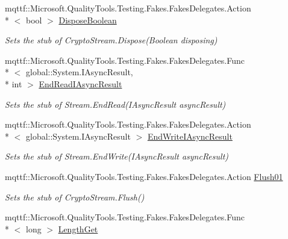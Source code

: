 \begin{DoxyCompactItemize}
mqttf\-::\-Microsoft.\-Quality\-Tools.\-Testing.\-Fakes.\-Fakes\-Delegates.\-Action\\*
$<$ bool $>$ \hyperlink{class_system_1_1_security_1_1_cryptography_1_1_fakes_1_1_stub_crypto_stream_afb4b1ab39426c48316f53e74feee9508}{Dispose\-Boolean}
\begin{DoxyCompactList}\small\item\em Sets the stub of Crypto\-Stream.\-Dispose(\-Boolean disposing)\end{DoxyCompactList}\item 
mqttf\-::\-Microsoft.\-Quality\-Tools.\-Testing.\-Fakes.\-Fakes\-Delegates.\-Func\\*
$<$ global\-::\-System.\-I\-Async\-Result, \\*
int $>$ \hyperlink{class_system_1_1_security_1_1_cryptography_1_1_fakes_1_1_stub_crypto_stream_aafd0c5a5584772dbd72efe3b71d7d7ee}{End\-Read\-I\-Async\-Result}
\begin{DoxyCompactList}\small\item\em Sets the stub of Stream.\-End\-Read(\-I\-Async\-Result async\-Result)\end{DoxyCompactList}\item 
mqttf\-::\-Microsoft.\-Quality\-Tools.\-Testing.\-Fakes.\-Fakes\-Delegates.\-Action\\*
$<$ global\-::\-System.\-I\-Async\-Result $>$ \hyperlink{class_system_1_1_security_1_1_cryptography_1_1_fakes_1_1_stub_crypto_stream_a9585b3a7159cc2dfd9fc541719978603}{End\-Write\-I\-Async\-Result}
\begin{DoxyCompactList}\small\item\em Sets the stub of Stream.\-End\-Write(\-I\-Async\-Result async\-Result)\end{DoxyCompactList}\item 
mqttf\-::\-Microsoft.\-Quality\-Tools.\-Testing.\-Fakes.\-Fakes\-Delegates.\-Action \hyperlink{class_system_1_1_security_1_1_cryptography_1_1_fakes_1_1_stub_crypto_stream_aa54e1b966931a70fbd6e966be990f4ca}{Flush01}
\begin{DoxyCompactList}\small\item\em Sets the stub of Crypto\-Stream.\-Flush()\end{DoxyCompactList}\item 
mqttf\-::\-Microsoft.\-Quality\-Tools.\-Testing.\-Fakes.\-Fakes\-Delegates.\-Func\\*
$<$ long $>$ \hyperlink{class_system_1_1_security_1_1_cryptography_1_1_fakes_1_1_stub_crypto_stream_a598a41dd576e8ba747c1f0b4dc11b6ce}{Length\-Get}

\end{DoxyCompactItemize}

